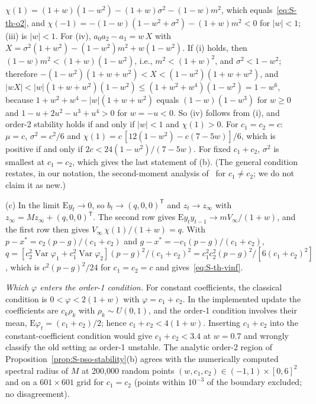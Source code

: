 \begin{thSproof}
$\chi(1)=(1+w)(1-w^2)-(1+w)\sigma^2-(1-w)m^2$, which equals~\eqref{eq:S-th-o2}, and
$\chi(-1)=-(1-w)(1-w^2+\sigma^2)-(1+w)m^2<0$ for $\lvert w\rvert<1$; (iii) is $\lvert w\rvert<1$. For (iv), $a_0a_2-a_1=w\,X$ with $X=\sigma^2(1+w^2)-(1-w^2)m^2+w(1-w^2)$. If (i) holds, then $(1-w)m^2<(1+w)(1-w^2)$, i.e., $m^2<(1+w)^2$, and $\sigma^2<1-w^2$; therefore $-(1-w^2)(1+w+w^2)<X<(1-w^2)(1+w+w^2)$, and $\lvert wX\rvert<\lvert w\rvert(1+w+w^2)(1-w^2)\le(1+w^2+w^4)(1-w^2)=1-w^6$, because $1+w^2+w^4-\lvert w\rvert(1+w+w^2)$ equals $(1-w)(1-w^3)$ for $w\ge0$ and $1-u+2u^2-u^3+u^4>0$ for $w=-u<0$. So (iv) follows from (i), and order-2 stability holds if and only if $\lvert w\rvert<1$ and $\chi(1)>0$. For $c_1=c_2=c$: $\mu=c$, $\sigma^2=c^2/6$ and $\chi(1)=c\,[12(1-w^2)-c(7-5w)]/6$, which is positive if and only if $2c<24(1-w^2)/(7-5w)$. For fixed $c_1+c_2$, $\sigma^2$ is smallest at $c_1=c_2$, which gives the last statement of (b). (The general condition restates, in our notation, the second-moment analysis of~\cite{Poli2009} for $c_1\ne c_2$; we do not claim it as new.)

(c) In the limit $\mathrm Ey_t\to0$, so $b_t\to(q,0,0)^{\mathsf T}$ and $z_t\to z_\infty$ with $z_\infty=Mz_\infty+(q,0,0)^{\mathsf T}$. The second row gives $\mathrm Ey_ty_{t-1}\to m V_\infty/(1+w)$, and the first row then gives $V_\infty\,\chi(1)/(1+w)=q$. With $p-x^*=c_2(p-g)/(c_1+c_2)$ and $g-x^*=-c_1(p-g)/(c_1+c_2)$, $q=[c_2^2\operatorname{Var}\varphi_1+c_1^2\operatorname{Var}\varphi_2](p-g)^2/(c_1+c_2)^2=c_1^2c_2^2(p-g)^2/[6(c_1+c_2)^2]$, which is $c^2(p-g)^2/24$ for $c_1=c_2=c$ and gives~\eqref{eq:S-th-vinf}.
\end{thSproof}

\emph{Which $\varphi$ enters the order-1 condition.} For constant coefficients, the classical condition is $0<\varphi<2(1+w)$ with $\varphi=c_1+c_2$. In the implemented update the coefficients are $c_k\rho_k$ with $\rho_k\sim U(0,1)$, and the order-1 condition involves their mean, $\mathrm E\varphi_t=(c_1+c_2)/2$; hence $c_1+c_2<4(1+w)$. Inserting $c_1+c_2$ into the constant-coefficient condition would give $c_1+c_2<3.4$ at $w=0.7$ and wrongly classify the old setting as order-1 unstable. The analytic order-2 region of Proposition~\ref{prop:S-pso-stability}(b) agrees with the numerically computed spectral radius of $M$ at 200{,}000 random points $(w,c_1,c_2)\in(-1,1)\times[0,6]^2$ and on a $601\times601$ grid for $c_1=c_2$ (points within $10^{-3}$ of the boundary excluded; no disagreement).

